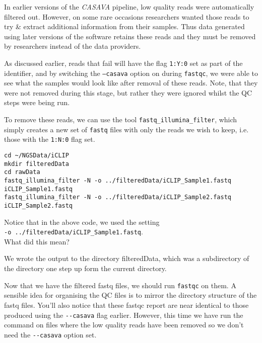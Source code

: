 \begin{information}
In earlier versions of the \textit{CASAVA} pipeline, low quality reads were automatically filtered out.
However, on some rare occasions researchers wanted those reads to try \& extract additional information from their samples.
Thus data generated using later versions of the software retains these reads and they must be removed by researchers instead of the data providers. \\
\end{information}

As discussed earlier, reads that fail will have the flag \texttt{1:Y:0} set as part of the identifier, and by switching the \texttt{--casava} option on during \texttt{fastqc}, we were able to see what the samples would look like after removal of these reads.
Note, that they were not removed during this stage, but rather they were ignored whilst the QC steps were being run. \\

\begin{steps}
To remove these reads, we can use the tool \texttt{fastq\_illumina\_filter}, which simply creates a new set of \texttt{fastq} files with only the reads we wish to keep, i.e. those with the \texttt{1:N:0} flag set.
\begin{lstlisting}
cd ~/NGSData/iCLIP
mkdir filteredData
cd rawData
fastq_illumina_filter -N -o ../filteredData/iCLIP_Sample1.fastq iCLIP_Sample1.fastq
fastq_illumina_filter -N -o ../filteredData/iCLIP_Sample2.fastq iCLIP_Sample2.fastq
\end{lstlisting}
\end{steps}

\begin{questions}
Notice that in the above code, we used the setting\\
\texttt{-o ../filteredData/iCLIP\_Sample1.fastq}.\\
What did this mean?\\
\begin{answer}
We wrote the output to the directory filteredData, which was a subdirectory of the directory one step up form the current directory.
\end{answer}
\end{questions}

\begin{information}
Now that we have the filtered fastq files, we should run \texttt{fastqc} on them.
A sensible idea for organising the QC files is to mirror the directory structure of the fastq files.
You'll also notice that these fastqc report are near identical to those produced using the \texttt{-{}-casava} flag earlier.
However, this time we have run the command on files where the low quality reads have been removed so we don't need the \texttt{-{}-casava} option set. \\
\end{information}


